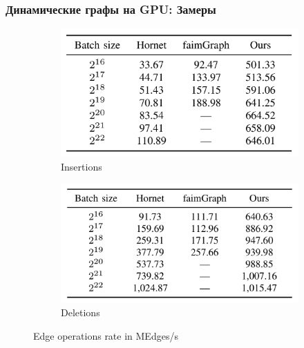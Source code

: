 \documentclass[xcolor=table,english]{beamer}
\begin{document}
\begin{frame}[fragile] \frametitle{Динамические графы на GPU: Замеры}
    \begin{minipage}[m]{1.0\linewidth}
        \begin{figure}
            \centering
            \begin{subfigure}[b]{0.47\textwidth}
                \includegraphics[width=\textwidth]{pictures/insertions.png}
                \caption{Insertions}
            \end{subfigure}
            \hfill
            \begin{subfigure}[b]{0.47\textwidth}
                \includegraphics[width=\textwidth]{pictures/deletions.png}
                \caption{Deletions}
            \end{subfigure}
            \caption{Edge operations rate in MEdges/s}
        \end{figure}
    \end{minipage}\hfill
\end{frame}
\end{document}
